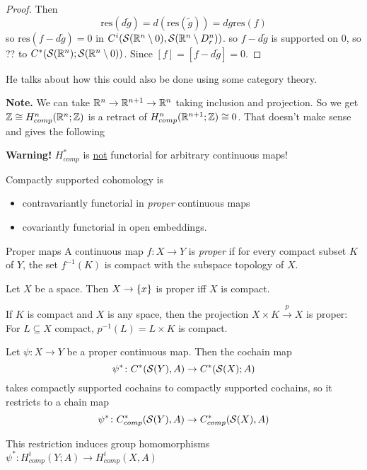 \documentclass[language=english]{TemplateLecture}
\begin{document}
\begin{example}
\begin{proof}
        Then
        \[\mathrm{res}(d\tilde g) = d(\mathrm{res}(\tilde g)) = dg \mathrm{res}(f)\]
        so \(\mathrm{res}(f - d\tilde g) = 0\) in \(C^i(\mathcal{S}(\mathbb{R}^n \setminus 0), \mathcal{S}(\mathbb{R}^n \setminus D_r^n))\). so \(f - d\tilde g\) is supported on \(0\), so ?? to \(C^*(\mathcal{S}(\mathbb{R}^n); \mathcal{S}(\mathbb{R}^n \setminus 0))\).
        Since \([f] = [f - d \tilde g] = 0\). 
    \end{proof}

    He talks about how this could also be done using some category theory.
\end{example}

\textbf{Note.} We can take \(\mathbb{R}^n \to \mathbb{R}^{n+1} \to \mathbb{R}^n\) taking inclusion and projection. So we get \(\mathbb{Z} \cong H_{comp}^n(\mathbb{R}^n; \mathbb{Z})\) is a retract of \(H_{comp}^n(\mathbb{R}^{n+1}; \mathbb{Z}) \cong 0\). That doesn't make sense and gives the following

\textbf{Warning!} \(H_{comp}^*\) is \underline{not} functorial for arbitrary continuous maps!

Compactly supported cohomology is
\begin{itemize}
    \item contravariantly functorial in \emph{proper} continuous maps
    \item covariantly functorial in open embeddings.
\end{itemize}

\begin{defi}{Proper maps}{}
    A continuous map \(f\colon X \to Y\) is \emph{proper} if for every compact subset \(K\) of \(Y\), the set \(f^{-1}(K)\) is compact with the subspace topology of \(X\).
\end{defi}

\begin{example}
    Let \(X\) be a space. Then \(X \to \{x\}\) is proper iff \(X\) is compact.

    If \(K\) is compact and \(X\) is any space, then the projection \(X \times K \xrightarrow{p} X\) is proper: For \(L \subseteq X\) compact, \(p^{-1}(L) = L \times K\) is compact.
\end{example}

\begin{proposition}
    Let \(\psi\colon X \to Y\) be a proper continuous map. Then the cochain map
    \[\psi^*\colon C^*(\mathcal{S}(Y),A) \to C^*(\mathcal{S}(X); A)\]
    takes compactly supported cochains to compactly supported cochains, so it restricts to a chain map
    \[\psi^*\colon C_{comp}^*(\mathcal{S}(Y),A) \to C_{comp}^*(\mathcal{S}(X),A)\]

    This restriction induces group homomorphisms \(\psi^*\colon H_{comp}^i(Y;A) \to H_{comp}^i(X,A)\)
\end{proposition}
\end{document}
